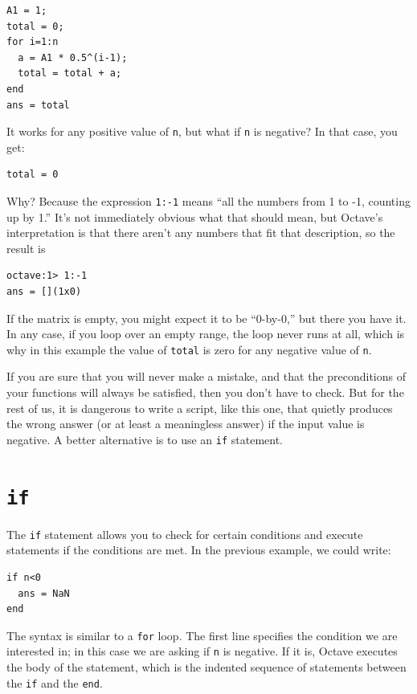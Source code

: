 \documentclass{book}
\begin{document}
\begin{verbatim}
A1 = 1;
total = 0;
for i=1:n
  a = A1 * 0.5^(i-1);
  total = total + a;
end
ans = total
\end{verbatim}

It works for any positive value of {\tt n}, but what if {\tt n}
is negative? In that case, you get:

\begin{verbatim}
total = 0
\end{verbatim}

Why? Because the expression {\tt 1:-1} means ``all the numbers
from 1 to -1, counting up by 1.'' It's not immediately obvious
what that should mean, but Octave's interpretation is that there
aren't any numbers that fit that description, so the result is

\begin{verbatim}
octave:1> 1:-1
ans = [](1x0)
\end{verbatim}

If the matrix is empty, you might expect it to be ``0-by-0,'' but
there you have it. In any case, if you loop over an empty range,
the loop never runs at all, which is why in this example the
value of {\tt total} is zero for any negative value of {\tt n}.

If you are sure that you will never make a mistake, and that the
preconditions of your functions will always be satisfied, then you
don't have to check. But for the rest of us, it is dangerous to write
a script, like this one, that quietly produces the wrong answer (or
at least a meaningless answer) if the input value is negative.
A better alternative is to use an {\tt if} statement.


\section{{\tt if}}

The {\tt if} statement allows you to check for certain conditions
and execute statements if the conditions are met. In the previous
example, we could write:

\begin{verbatim}
if n<0
  ans = NaN
end
\end{verbatim}

The syntax is similar to a {\tt for} loop. The first line
specifies the condition we are interested in; in this case we
are asking if {\tt n} is negative. If it is, Octave executes
the body of the statement, which is the indented sequence of
statements between the {\tt if} and the {\tt end}.
\end{document}
